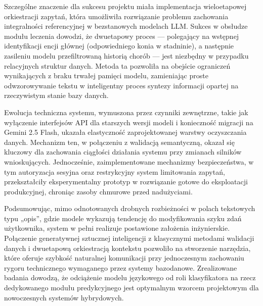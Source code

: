 Szczególne znaczenie dla sukcesu projektu miała implementacja wieloetapowej orkiestracji zapytań, która umożliwiła rozwiązanie problemu zachowania integralności referencyjnej w bezstanowych modelach LLM. Sukces w obsłudze modułu leczenia dowodzi, że dwuetapowy proces — polegający na wstępnej identyfikacji encji głównej (odpowiedniego konia w stadninie), a następnie zasileniu modelu przefiltrowaną historią chorób — jest niezbędny w przypadku relacyjnych struktur danych. Metoda ta pozwoliła na obejście ograniczeń wynikających z braku trwałej pamięci modelu, zamieniając proste odwzorowywanie tekstu w inteligentny proces syntezy informacji opartej na rzeczywistym stanie bazy danych.

Ewolucja techniczna systemu, wymuszona przez czynniki zewnętrzne, takie jak wyłączenie interfejsów API dla starszych wersji modeli i konieczność migracji na Gemini 2.5 Flash, ukazała elastyczność zaprojektowanej warstwy oczyszczania danych. Mechanizm ten, w połączeniu z walidacją semantyczną, okazał się kluczowy dla zachowania ciągłości działania systemu przy zmianach silników wnioskujących. Jednocześnie, zaimplementowane mechanizmy bezpieczeństwa, w tym autoryzacja sesyjna oraz restrykcyjny system limitowania zapytań, przekształciły eksperymentalny prototyp w rozwiązanie gotowe do eksploatacji produkcyjnej, chroniąc zasoby chmurowe przed nadużyciami.

Podsumowując, mimo odnotowanych drobnych rozbieżności w polach tekstowych typu „opis”, gdzie modele wykazują tendencję do modyfikowania szyku zdań użytkownika, system w pełni realizuje postawione założenia inżynierskie. Połączenie generatywnej sztucznej inteligencji z klasycznymi metodami walidacji danych i dwuetapową orkiestracją kontekstu pozwoliło na stworzenie narzędzia, które oferuje szybkość naturalnej komunikacji przy jednoczesnym zachowaniu rygoru technicznego wymaganego przez systemy bazodanowe. Zrealizowane badania dowodzą, że odciążenie modelu językowego od roli klasyfikatora na rzecz dedykowanego modułu predykcyjnego jest optymalnym wzorcem projektowym dla nowoczesnych systemów hybrydowych.
